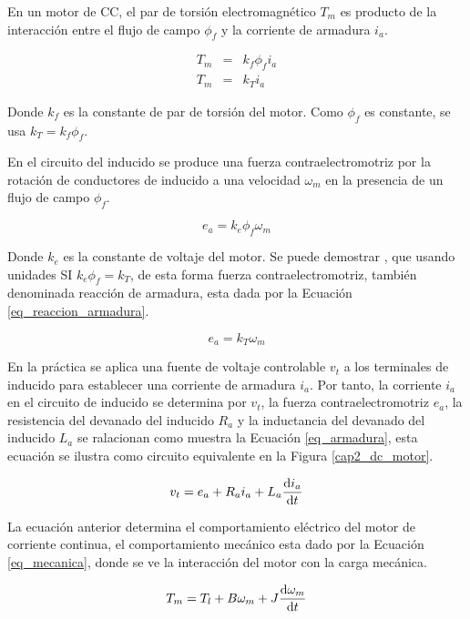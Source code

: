 En un motor de CC, el par de torsión electromagnético $T_m$ es producto de la interacción entre el flujo de campo $\phi_f$ y la corriente de armadura $i_a$.

\begin{eqnarray}
T_m &=& k_f \phi_f i_a \\
T_m &=& k_T i_a
\end{eqnarray}

Donde $k_f$ es la constante de par de torsión del motor. Como $\phi_f$ es constante, se usa $k_T= k_f \phi_f$.

En el circuito del inducido se produce una fuerza contraelectromotriz por la rotación de conductores de inducido a una velocidad $\omega_m$ en la presencia de un flujo de campo $\phi_f$.

\begin{equation}
e_a = k_e \phi_f \omega_m
\end{equation}

Donde $k_e$ es la constante de voltaje del motor. Se puede demostrar \cite{mohan}, que usando unidades SI $k_e \phi_f = k_T$, de esta forma fuerza contraelectromotriz, también denominada reacción de armadura, esta dada por la Ecuación \ref{eq_reaccion_armadura}.

\begin{equation}\label{eq_reaccion_armadura}
e_a = k_T \omega_m
\end{equation}

En la práctica se aplica una fuente de voltaje controlable $v_t$ a los terminales de inducido para establecer una corriente de armadura $i_a$. Por tanto, la corriente $i_a$ en el circuito de inducido se determina por $v_t$, la fuerza contraelectromotriz $e_a$, la resistencia del devanado del inducido $R_a$ y la inductancia del devanado del inducido $L_a$ se ralacionan como muestra la Ecuación \ref{eq_armadura}, esta ecuación se ilustra como circuito equivalente en la Figura \ref{cap2_dc_motor}.

\begin{equation}\label{eq_armadura}
v_t = e_a + R_a i_a + L_a \dv{i_a}{t}
\end{equation}

La ecuación anterior determina el comportamiento eléctrico del motor de corriente continua, el comportamiento mecánico esta dado por la Ecuación \ref{eq_mecanica}, donde se ve la interacción del motor con la carga mecánica.

\begin{equation}\label{eq_mecanica}
T_m = T_l + B \omega_m + J \dv{\omega_m}{t}
\end{equation}

